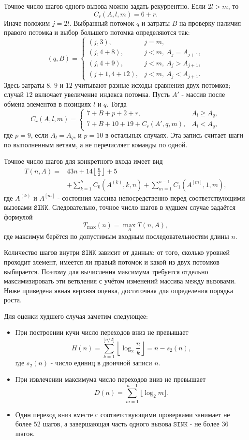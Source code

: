 \documentclass[12pt]{article}
\begin{document}
Точное число шагов одного вызова можно задать рекуррентно. Если $2l>m$, то
\[
    C_r(A,l,m)=6+r.
\]
Иначе положим $j=2l$. Выбранный потомок $q$ и затраты $B$ на проверку наличия правого потомка и выбор большего потомка определяются так:
\[
(q,B)=
\begin{cases}
(j,3), & j=m,\\
(j,4+8), & j<m,\ A_j=A_{j+1},\\
(j,4+9), & j<m,\ A_j>A_{j+1},\\
(j+1,4+12), & j<m,\ A_j<A_{j+1}.
\end{cases}
\]
Здесь затраты $8$, $9$ и $12$ учитывают разные исходы сравнения двух потомков; случай $12$ включает увеличение индекса потомка. Пусть $A'$ - массив после обмена элементов в позициях $l$ и $q$. Тогда
\[
C_r(A,l,m)=
\begin{cases}
7+B+p+2+r, & A_l\geq A_q,\\
7+B+10+19+C_r(A',q,m), & A_l<A_q,
\end{cases}
\]
где $p=9$, если $A_l=A_q$, и $p=10$ в остальных случаях. Эта запись считает шаги по выполненным ветвям, а не перечисляет команды по одной.

Точное число шагов для конкретного входа имеет вид
\[
\begin{aligned}
T(n,A)={}&43n+14\left\lfloor\frac n2\right\rfloor+5\\
&+\sum_{k=1}^{h} C_0(A^{(k)},k,n)
+\sum_{m=1}^{n-1} C_1(A^{[m]},1,m),
\end{aligned}
\]
где $A^{(k)}$ и $A^{[m]}$ - состояния массива непосредственно перед соответствующими вызовами $\texttt{SINK}$. Следовательно, точное число шагов в худшем случае задаётся формулой
\[
    T_{\max}(n)=\max_{A} T(n,A),
\]
где максимум берётся по допустимым входным последовательностям длины $n$.

Количество шагов внутри $\texttt{SINK}$ зависит от данных: от того, сколько уровней проходит элемент, имеется ли правый потомок и какой из двух потомков выбирается. Поэтому для вычисления максимума требуется отдельно максимизировать эти ветвления с учётом изменений массива между вызовами. Ниже приведена явная верхняя оценка, достаточная для определения порядка роста.

Для оценки худшего случая заметим следующее:
\begin{itemize}
    \item При построении кучи число переходов вниз не превышает
    \[
        H(n)=\sum_{k=1}^{\lfloor n/2\rfloor}\left\lfloor\log_2\frac nk\right\rfloor
        =n-s_2(n),
    \]
    где $s_2(n)$ - число единиц в двоичной записи $n$.
    \item При извлечении максимума число переходов вниз не превышает
    \[
        D(n)=\sum_{m=1}^{n-1}\lfloor\log_2 m\rfloor.
    \]
    \item Один переход вниз вместе с соответствующими проверками занимает не более $52$ шагов, а завершающая часть одного вызова $\texttt{SINK}$ - не более $36$ шагов.
\end{itemize}
\end{document}
